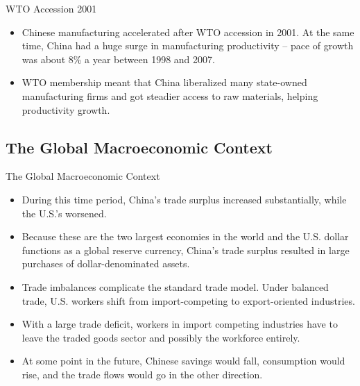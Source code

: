 \documentclass[aspectratio=169]{beamer}
\begin{document}
\begin{frame}{WTO Accession 2001}

\begin{itemize}
    \item<1-> Chinese manufacturing accelerated after WTO accession in 2001.  At the same time, China had a huge surge in manufacturing productivity – pace of growth was about 8\% a year between 1998 and 2007.
    \item<2-> WTO membership meant that China liberalized many state-owned manufacturing firms and got steadier access to raw materials, helping productivity growth.
\end{itemize}
    
\end{frame}


\subsection{The Global Macroeconomic Context}


\begin{frame}{The Global Macroeconomic Context}

\begin{itemize}
    \item<1-> During this time period, China’s trade surplus increased substantially, while the U.S.'s worsened.
    \item<2-> Because these are the two largest economies in the world and the U.S. dollar functions as a global reserve currency, China’s trade surplus resulted in large purchases of dollar-denominated assets.
    \item<3-> Trade imbalances complicate the standard trade model.  Under balanced trade, U.S. workers shift from import-competing to export-oriented industries.
    \item<4-> With a large trade deficit, workers in import competing industries have to leave the traded goods sector and possibly the workforce entirely.
    \item<5-> At some point in the future, Chinese savings would fall, consumption would rise, and the trade flows would go in the other direction.
\end{itemize}
    
\end{frame}
\end{document}
